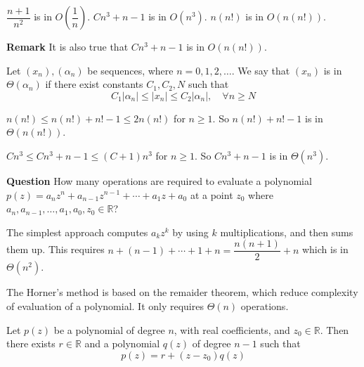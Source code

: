 \documentclass[main.tex]{subfiles}
\begin{document}
\begin{example}
    $\dfrac{n + 1}{n^2}$ is in $O(\dfrac{1}{n})$. $Cn^3 + n - 1$ is in $O(n^3)$. $n(n!)$ is in $O(n(n!))$.
\end{example}
\par \noindent \textbf{Remark} It is also true that $Cn^3 + n - 1$ is in $O(n(n!))$. 

\begin{definition}
    Let $(x_n), (\alpha_n)$ be sequences, where $n = 0, 1, 2, \ldots$. We say that $(x_n)$ is in $\Theta(\alpha_n)$ if there exist constants $C_1, C_2, N$ such that
    \[
        C_1 |\alpha_n| \leq |x_n| \leq C_2 |\alpha_n|, \quad \forall n \geq N
    \]
\end{definition}

\begin{example}
    $n(n!) \le n(n!) + n! - 1 \le 2n(n!)$ for $n \geq 1$. So $n(n!) + n! - 1$ is in $\Theta(n(n!))$. 
\end{example}

\begin{example}
    $Cn^3 \le Cn^3 + n - 1 \le (C+1) n^3$ for $n \geq 1$. So $Cn^3 + n - 1$ is in $\Theta(n^3)$. 
\end{example}
\par \noindent \textbf{Question} How many operations are required to evaluate a polynomial $p(z) = a_n z^n + a_{n-1} z^{n-1} + \cdots + a_1 z + a_0$ at a point $z_0$ where $a_n, a_{n-1}, \ldots, a_1, a_0, z_0 \in \mathbb{R}$? 
\par The simplest approach computes $a_k z^k$ by using $k$ multiplications, and then sums them up. This requires $n + (n-1) + \cdots + 1 + n = \dfrac{n(n+1)}{2} + n $ which is in $\Theta(n^2)$. 
\par The Horner's method is based on the remaider theorem, which reduce complexity of evaluation of a polynomial. It only requires $\Theta(n)$ operations.  
\begin{theorem}
    Let $p(z)$ be a polynomial of degree $n$, with real coefficients, and $z_0\in \mathbb{R}$. Then there exists $r\in \mathbb{R}$ and a polynomial $q(z)$ of degree $n-1$ such that
    \[
        p(z) = r + (z - z_0) q(z)
    \]
\end{theorem}
\end{document}
